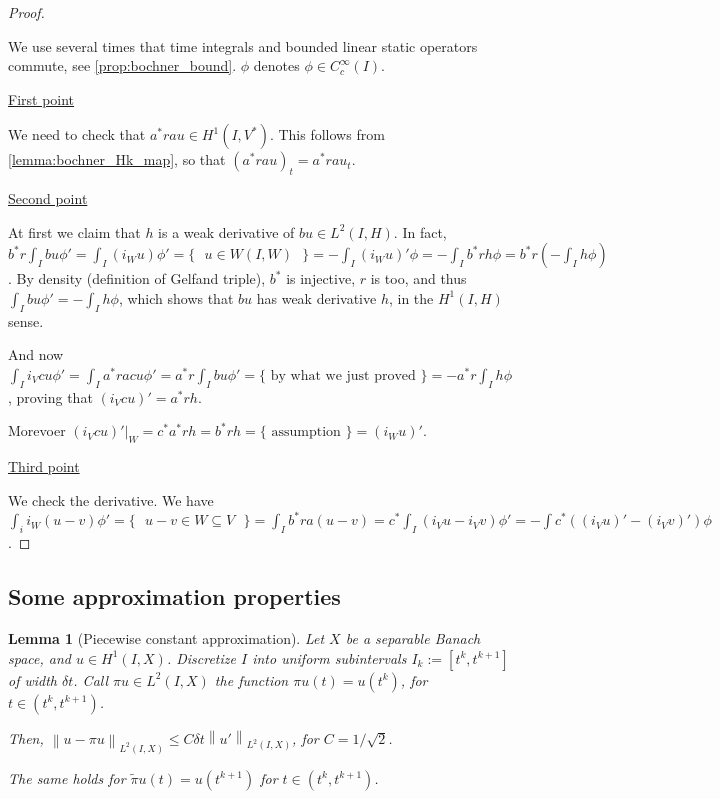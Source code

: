 \documentclass[english,a4paper,10pt,oneside]{scrbook}	%
\theoremstyle{break}
\newtheorem{lemma}[equation]{Lemma}
\newenvironment{mproof}[1][\proofname]{%
  \begin{proof}[#1]$ $\par\nobreak\ignorespaces
}{%
  \end{proof}
}
\renewcommand*{\proofname}{Proof}
\theoremstyle{remark}
\newcommand{\norm}[1]{\left\lVert#1\right\rVert}
\newcommand{\ind}[1]{\{\text{ #1 }\}}
\newcommand{\mind}[1]{$#1$}
\begin{document}
\begin{mproof}

We use several times that time integrals and bounded linear static operators commute, see \cref{prop:bochner_bound}. $\phi$ denotes $\phi \in C^\infty_c(I)$.

\underline{First point}

We need to check that $a^* r a u \in H^1(I, V^*)$. This follows from \cref{lemma:bochner_Hk_map}, so that $(a^* r a u)_t = a^* r a u_t$.

\underline{Second point}

At first we claim that $h$ is a weak derivative of $bu \in L^2(I,H)$. In fact, $b^* r \int_I bu \phi' = \int_I (i_W u)\phi' = \ind{\mind{u \in W(I,W)}} =-\int_I(i_Wu)'\phi=-\int_I b^*r h\phi = b^*r (-\int_I h \phi)$. By density (definition of Gelfand triple), $b^*$ is injective, $r$ is too, and thus $\int_I bu \phi' = -\int_I h \phi$, which shows that $bu$ has weak derivative $h$, in the $H^1(I,H)$ sense.

And now $\int_I i_V c u \phi'= \int_I a^*racu \phi' = a^*r\int_I bu\phi' = \ind{by what we just proved}=-a^*r \int_I h \phi$, proving that $(i_V cu)'=a^*r h$.

Morevoer $(i_V cu)'|_W = c^*a^*r h=b^*rh=\ind{assumption} = (i_W u)'$.

\underline{Third point}

We check the derivative. We have $\int_i i_W(u-v)\phi' =\ind{\mind{u-v \in W\subseteq V}} = \int_I b^* r a (u-v) = c^*\int_I(i_Vu - i_Vv)\phi' = -\int c^*((i_V u)'- (i_V v)')\phi$.

\end{mproof}

\subsection{Some approximation properties}

\begin{lemma}[Piecewise constant approximation]
\label{lemma:pw_constant_appr}
Let $X$ be a separable Banach space, and $u \in H^1(I,X)$. Discretize $I$ into uniform subintervals $I_k:=[t^k,t^{k+1}]$ of width $\delta t$. Call $\pi u \in L^2(I,X)$ the function $\pi u(t)=u(t^{k})$, for $t \in (t^k,t^{k+1})$.

Then, $\norm{u-\pi u}_{L^2(I,X)}\leq C \delta t \norm{u'}_{L^2(I,X)}$, for $C=1/\sqrt{2}$.


The same holds for $\tilde{\pi}u(t) = u(t^{k+1})$ for $t \in (t^k,t^{k+1})$.

\end{lemma}
\end{document}
